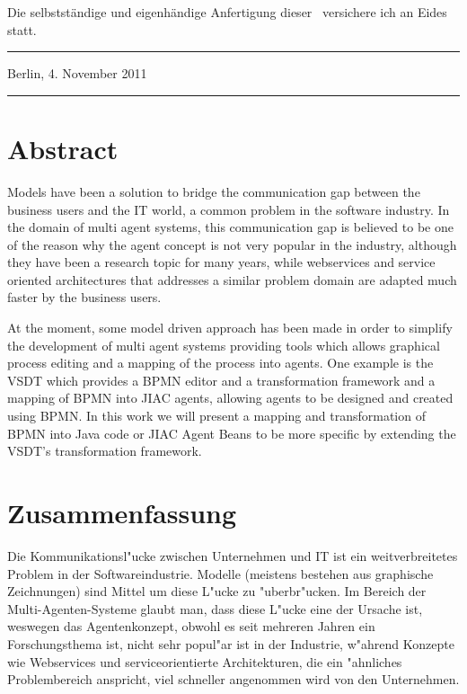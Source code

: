 
Die selbstst\"{a}ndige und eigenh\"{a}ndige Anfertigung dieser \ARTDERARBEIT\
versichere ich an Eides statt.

\vspace{4cm}
\parbox{6cm}{\hrule \strut \centering \small Berlin, 4. November 2011}
\hfill
\parbox{6cm}{\hrule \strut \centering \small \AUTOR}

\newpage



\section*{Abstract}
Models have been a solution to bridge the communication gap between the business users and the IT world, a common problem in the software industry. In the domain of multi agent systems, this communication gap is believed to be one of the reason why the agent concept is not very popular in the industry, although they have been a research topic for many years, while webservices and service oriented architectures that addresses a similar problem domain are adapted much faster by the business users. 
 
At the moment, some model driven approach has been made in order to simplify the development of multi agent systems providing tools which allows graphical process editing and a mapping of the process into agents. One example is the VSDT which provides a BPMN editor and a transformation framework and a mapping of BPMN into JIAC agents, allowing agents to be designed and created using BPMN. In this work we will present a mapping and transformation of BPMN into Java code or JIAC Agent Beans to be more specific by extending the VSDT's transformation framework.


\section*{Zusammenfassung}
Die Kommunikationsl"ucke zwischen Unternehmen und IT ist ein weitverbreitetes Problem in der Softwareindustrie. Modelle (meistens bestehen aus graphische Zeichnungen) sind Mittel um diese L"ucke zu "uberbr"ucken. Im Bereich der Multi-Agenten-Systeme glaubt man, dass diese L"ucke eine der Ursache ist, weswegen das Agentenkonzept, obwohl es seit mehreren Jahren ein Forschungsthema ist, nicht sehr popul"ar ist in der Industrie, w"ahrend Konzepte wie Webservices und serviceorientierte Architekturen, die ein "ahnliches Problembereich anspricht, viel schneller angenommen wird von den Unternehmen.

